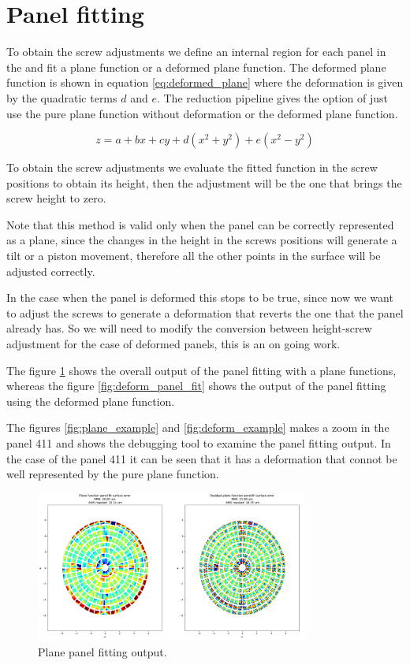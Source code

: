\section{Panel fitting}

To obtain the screw adjustments we define an internal region for each panel in the and fit a plane function or a deformed plane function. 
The deformed plane function is shown in equation \ref{eq:deformed_plane} where the deformation is given by the quadratic terms $d$ and $e$. The reduction pipeline gives the option of just use the pure plane function without deformation or the deformed plane function.

\begin{equation}
    z = a+bx+cy+d(x^2+y^2)+e(x^2-y^2)
    \label{eq:deformed_plane}
\end{equation}

To obtain the screw adjustments we evaluate the fitted function in the screw positions to obtain its height, then the adjustment will be the one that brings the screw height to zero. 

Note that this method is valid only when the panel can be correctly represented as a plane, since the changes in the height in the screws positions will generate a tilt or a piston movement, therefore all the other points in the surface will be adjusted correctly.

In the case when the panel is deformed this stops to be true, since now we want to adjust the screws to generate a deformation that reverts the one that the panel already has. So we will need to modify the conversion between height-screw adjustment for the case of deformed panels, this is an on going work.



The figure \ref{fig:plane_panel_fit} shows the overall output of the panel fitting with a plane functions, whereas the figure \ref{fig:deform_panel_fit} shows the output of the panel fitting using the deformed plane function.

The figures \ref{fig:plane_example} and \ref{fig:deform_example} makes a zoom in the panel 411 and shows the debugging tool to examine the panel fitting output. In the case of the panel 411 it can be seen that it has a deformation that connot be well represented by the pure plane function.




\begin{figure}
    \centering
    \includegraphics[width=0.8\textwidth]{images/plane_panel_fit.png}
    \caption{Plane panel fitting output.}
    \label{fig:plane_panel_fit}
\end{figure}


